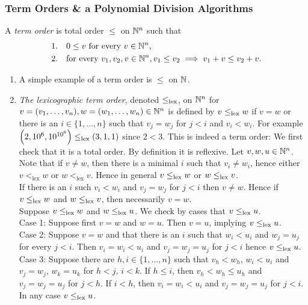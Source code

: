 \subsubsection{Term Orders \& a Polynomial Division Algorithms}

\begin{definition}
    A \textit{term order} is total order $\leq$ on $\mathbb{N}^n$ such that 
    \begin{align*}
        &1. \quad 0\leq v \text{ for every } v\in \mathbb{N}^n,\\
        &2. \quad \text{for every } v_1,v_2,v\in \mathbb{N}^n, v_1\leq v_2\implies v_1+v\leq v_2+v.
    \end{align*}
\end{definition}

\begin{example}
    \begin{enumerate}
        \item A simple example of a term order is $\leq$ on $\mathbb{N}$. 
        \item \textit{The lexicographic term order}, denoted $\leq_{\text{lex}}$, on $\mathbb{N}^n$ for $v=(v_1,\dots,v_n),w=(w_1,\dots,w_n)\in \mathbb{N}^n$ is defined by $v\leq_{\text{lex}} w$ if $v=w$ or there is an $i\in \{1,\dots,n\}$ such that $v_j = w_j$ for $j<i$ and $v_i < w_i$. For example $\left(2,10^6,10^{10^6}\right)\leq_{\text{lex}} (3,1,1)$ since $2<3$. This is indeed a term order: We first check that it is a total order. By definition it is reflexive. Let $v,w,u\in \mathbb{N}^n$.\\
        Note that if $v \neq w$, then there is a minimal $i$ such that $v_i \neq w_i$, hence either $v <_\text{lex} w$ or $w <_\text{lex} v$. Hence in general $v\leq_{\text{lex}} w$ or $w\leq_{\text{lex}} v$.\\ 
        If there is an $i$ such $v_i < w_i$ and $v_j=w_j$ for $j<i$ then $v\neq w$. Hence if $v\leq_{\text{lex}} w$ and $w\leq_{\text{lex}} v$, then necessarily $v=w$.\\
        Suppose $v\leq_{\text{lex}} w$ and $w\leq_{\text{lex}} u$. We check by cases that $v \leq_{\text{lex}} u$.\\
        Case 1: Suppose first $v = w$ and $w = u$. Then $v=u$, implying $v\leq_{\text{lex}} u$.\\
        Case 2: Suppose $v=w$ and that there is an $i$ such that $w_i<u_i$ and $w_j=u_j$ for every $j<i$. Then $v_i = w_i < u_i$ and $v_j = w_j = u_j$ for $j<i$ hence $v \leq_{\text{lex}} u$.\\
        Case 3: Suppose there are $h,i\in \{1,\dots,n\}$ such that $v_h < w_h$, $w_i <u_i$ and $v_j=w_j$, $w_k = u_k$ for $h<j$, $i<k$. If $h\leq i$, then $v_h < w_h \leq u_h$ and $v_j = w_j = u_j$ for $j<h$. If $i< h$, then $v_i = w_i < u_i $ and $v_j=w_j=u_j$ for $j<i$. In any case $v\leq_{\text{lex}} u$.\\

\end{enumerate}
\end{example}
